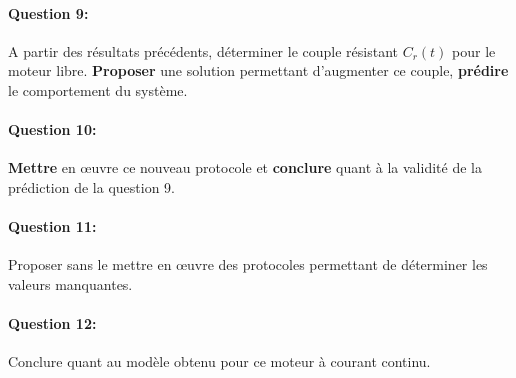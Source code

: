

\paragraph{Question 9:} A partir des résultats précédents, déterminer le couple résistant $C_r(t)$ pour le moteur libre. \textbf{Proposer} une solution permettant d'augmenter ce couple, \textbf{prédire} le comportement du système.


\paragraph{Question 10:} \textbf{Mettre} en \oe uvre ce nouveau protocole et \textbf{conclure} quant à la validité de la prédiction de la question 9.

\newpage


\paragraph{Question 11:} Proposer sans le mettre en \oe uvre des protocoles permettant de déterminer les valeurs manquantes.

\paragraph{Question 12:} Conclure quant au modèle obtenu pour ce moteur à courant continu.

